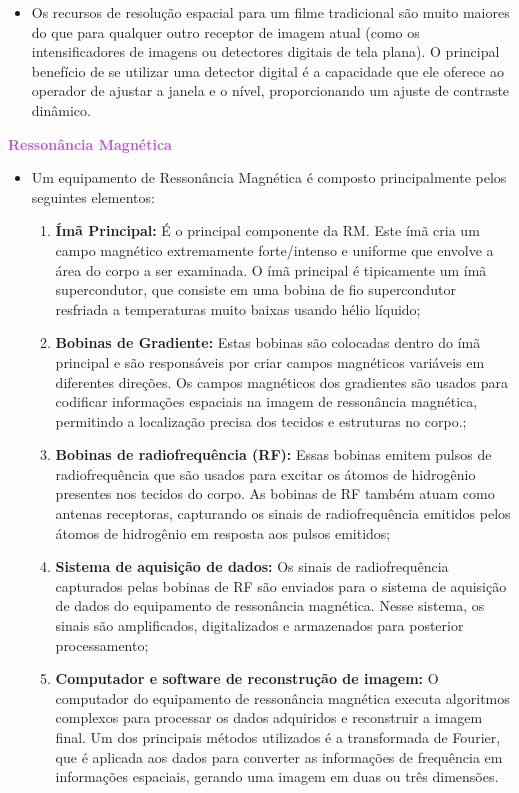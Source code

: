 \documentclass[11pt,a4paper]{article}
\newcounter{exemplo}
\begin{document}
\begin{exemplo}
\begin{itemize}
        \item Os recursos de resolução espacial para um filme tradicional são muito maiores do que para qualquer outro receptor de imagem atual (como os intensificadores de imagens ou detectores digitais de tela plana). O principal benefício de se utilizar uma detector digital é a capacidade que ele oferece ao operador de ajustar a janela e o nível, proporcionando um ajuste de contraste dinâmico.
       
    \end{itemize}

    \textcolor{MediumOrchid}{\LobsterTwo\textbf{Ressonância Magnética}}
    \begin{itemize}
        \item Um equipamento de Ressonância Magnética é composto principalmente pelos seguintes elementos:
        \begin{enumerate}
            \item \textbf{Ímã Principal:} É o principal componente da RM. Este ímã cria um campo magnético extremamente forte/intenso e uniforme que envolve a área do corpo a ser examinada. O ímã principal é tipicamente um ímã supercondutor, que consiste em uma bobina de fio supercondutor resfriada a temperaturas muito baixas usando hélio líquido;
            \item \textbf{Bobinas de Gradiente:} Estas bobinas são colocadas dentro do ímã principal e são responsáveis por criar campos magnéticos variáveis em diferentes direções. Os campos magnéticos dos gradientes são usados para codificar informações espaciais na imagem de ressonância magnética, permitindo a localização precisa dos tecidos e estruturas no corpo.;
            \item \textbf{Bobinas de radiofrequência (RF):} Essas bobinas emitem pulsos de radiofrequência que são usados para excitar os átomos de hidrogênio presentes nos tecidos do corpo. As bobinas de RF também atuam como antenas receptoras, capturando os sinais de radiofrequência emitidos pelos átomos de hidrogênio em resposta aos pulsos emitidos;
            \item \textbf{Sistema de aquisição de dados:} Os sinais de radiofrequência capturados pelas bobinas de RF são enviados para o sistema de aquisição de dados do equipamento de ressonância magnética. Nesse sistema, os sinais são amplificados, digitalizados e armazenados para posterior processamento;
            \item \textbf{Computador e software de reconstrução de imagem:} O computador do equipamento de ressonância magnética executa algoritmos complexos para processar os dados adquiridos e reconstruir a imagem final. Um dos principais métodos utilizados é a transformada de Fourier, que é aplicada aos dados para converter as informações de frequência em informações espaciais, gerando uma imagem em duas ou três dimensões.
        \end{enumerate}
        

\end{itemize}
\end{exemplo}
\end{document}
